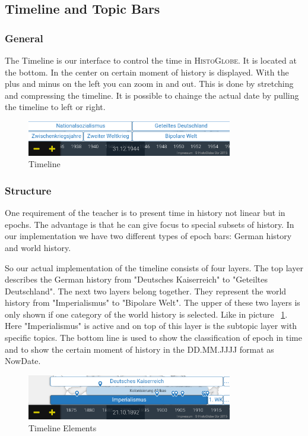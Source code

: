 \subsection{Timeline and Topic Bars}

\subsubsection{General}
The Timeline is our interface to control the time in \textsc{HistoGlobe}. It is located at the bottom. In the center on certain moment of history is displayed. With the plus and minus on the left you can zoom in and out. This is done by stretching and compressing the timeline. It is possible to chainge the actual date by pulling the timeline to left or right.

\begin{figure}[H]
	\centering
	\includegraphics[width=0.8\textwidth]{graphics/timeline_now.png}
	\caption{Timeline}
\end{figure}

\subsubsection{Structure}
One requirement of the teacher is to present time in history not linear but in epochs. The advantage is that he can give focus to special subsets of history. In our implementation we have two different types of epoch bars: German history and world history.

So our actual implementation of the timeline consists of four layers. The top layer describes the German history from "Deutsches Kaiserreich" to "Geteiltes Deutschland". The next two layers belong together. They represent the world history from "Imperialismus" to "Bipolare Welt". The upper of these two layers is only shown if one category of the world history is selected. Like in picture ~\ref{fig:Timeline_Elements}. Here "Imperialismus" is active and on top of this layer is the subtopic layer with specific topics. The bottom line is used to show the classification of epoch in time and to show the certain moment of history in the DD.MM.JJJJ format as NowDate.

\begin{figure}[H]
	\centering
	\includegraphics[width=0.8\textwidth]{graphics/timeline_elements.png}
	\caption{Timeline Elements}
	\label{fig:Timeline_Elements}
\end{figure}




